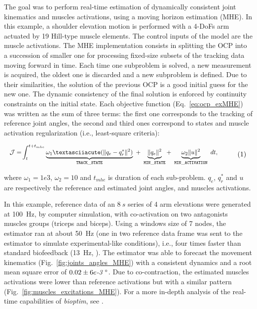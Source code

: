 The goal was to perform real-time estimation of dynamically consistent joint kinematics and muscles activations, using a moving horizon estimation (MHE). 
In this example, a shoulder elevation motion is performed with a 4-DoFs arm actuated by 19 Hill-type muscle elements.
The control inputs of the model are the muscle activations.
The MHE implementation consists in splitting the OCP into a succession of smaller one for processing fixed-size subsets of the tracking data moving forward in time. 
Each time one subproblem is solved, a new measurement is acquired, the oldest one is discarded and a new subproblem is defined. 
Due to their similarities, the solution of the previous OCP is a good initial guess for the new one. 
The dynamic consistency of the final solution is enforced by continuity constraints on the initial state. 
Each objective function (Eq.~\ref{eq:ocp_exMHE}) was written as the sum of three terms: the first one corresponds to the tracking of reference joint angles, the second and third ones correspond to states and muscle activation regularization (i.e., least-square criteria): 

\[ 
\resizebox{0.9\columnwidth}{!}{$ 
\begin{aligned}
\mathcal{J} = &\int_t^{t+t_{mhe}}\underbrace{\omega_1´(\|q_{e} - q^*_{r}\|^{2})}_{\mathtt{TRACK\_STATE}}~ 
+ ~ \underbrace{\|q_{e}\|^2}_{\mathtt{MIN\_STATE}}
+ ~ \underbrace{\omega_2 \|u\|^2}_{\mathtt{MIN\_ACTIVATION}}~dt, 
\end{aligned}  
$}  
\addtag  
\label{eq:ocp_exMHE}  
\]  

\noindent where $\omega_1 =1e3$, $\omega_2 = 10$ and $t_{mhe}$ is duration of each sub-problem. $q_{e}$, $q^*_{r}$  and $u$ are respectively the reference and estimated joint angles, and muscles activations. 

In this example, reference data of an $8~s$ series of 4 arm elevations were generated at 100~Hz, by computer simulation, with co-activation on two antagonists muscles groups (triceps and biceps).
Using a windows size of 7 nodes, the estimator ran at about 50~Hz (one in two reference data frame was sent to the estimator to simulate experimental-like conditions), i.e., four times faster than standard biofeedback (13~Hz, \cite{kannape2013biofeedback}).
The estimator was able to forecast the movement kinematics (Fig.~\ref{fig:joints_angles_MHE}) with a consistent dynamics and a root mean square error of $0.02\pm6e\emph{-3}\text{~}^{\circ}$.
Due to co-contraction, the estimated muscles activations were lower than reference activations but with a similar pattern (Fig.~\ref{fig:muscles_excitations_MHE}).  
For a more in-depth analysis of the real-time capabilities of \textit{bioptim}, see \cite{bailly2020real}.
 

